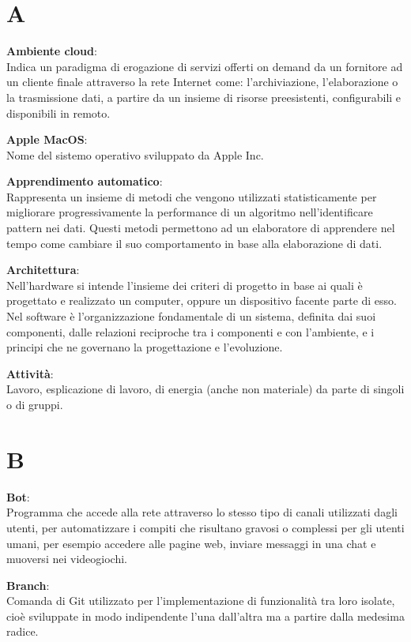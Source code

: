\documentclass[a4paper, oneside, openany, dvipsnames, table]{article}
\begin{document}
\copertina{}


\newpage
\tableofcontents
\newpage


\newpage
\section{A}  
\textbf{Ambiente cloud}:\\	 Indica un paradigma di erogazione di servizi offerti on demand da un fornitore ad un cliente finale attraverso la rete Internet come: l'archiviazione, l'elaborazione o la trasmissione dati, a partire da un insieme di risorse preesistenti, configurabili e disponibili in remoto.

\textbf{Apple MacOS}:\\ Nome del sistemo operativo sviluppato da Apple Inc.

\label{par:appr_auto}
\textbf{Apprendimento automatico}:\\	Rappresenta un insieme di metodi che vengono utilizzati statisticamente per migliorare progressivamente la performance di un algoritmo nell'identificare pattern nei dati. Questi metodi  permettono ad un elaboratore di apprendere nel tempo come cambiare il suo comportamento in base alla elaborazione di dati.

\textbf{Architettura}: \\ Nell'hardware si intende l'insieme dei criteri di progetto in base ai quali è progettato e realizzato un computer, oppure un dispositivo facente parte di esso. Nel software è l'organizzazione fondamentale di un sistema, definita dai suoi componenti, dalle relazioni reciproche tra i componenti e con l'ambiente, e i principi che ne governano la progettazione e l'evoluzione.

\textbf{Attività}:\\ Lavoro, esplicazione di lavoro, di energia (anche non materiale) da parte di singoli o di gruppi.


\newpage
\section{B}
\textbf{Bot}:\\	Programma che accede alla rete attraverso lo stesso tipo di canali utilizzati dagli utenti, per automatizzare i compiti che risultano gravosi o complessi per gli utenti umani, per esempio accedere alle pagine web, inviare messaggi in una chat e  muoversi nei videogiochi. 

\textbf{Branch}:\\ Comanda di Git utilizzato per l’implementazione di funzionalità tra loro isolate, cioè sviluppate in modo indipendente l’una dall’altra ma a partire dalla medesima radice.
\end{document}
